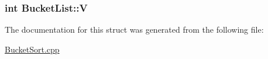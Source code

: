 \subsubsection[{\texorpdfstring{V}{V}}]{\setlength{\rightskip}{0pt plus 5cm}int Bucket\+List\+::V}\hypertarget{structBucketList_a986196d1d435700557398237ad52fee9}{}\label{structBucketList_a986196d1d435700557398237ad52fee9}


The documentation for this struct was generated from the following file\+:\begin{DoxyCompactItemize}
\item 
\hyperlink{BucketSort_8cpp}{Bucket\+Sort.\+cpp}\end{DoxyCompactItemize}
